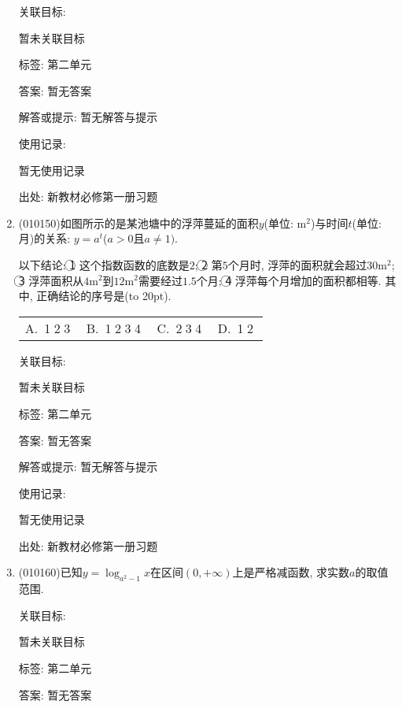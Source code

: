 \documentclass[10pt,a4paper]{article}
\newcommand{\bracket}[1]{(\hbox to #1pt{})}
\newcommand{\fourch}[4]{\par\begin{tabular}{p{.23\textwidth}p{.23\textwidth}p{.23\textwidth}p{.23\textwidth}}
A.~#1 &B.~#2& C.~#3& D.~#4
\end{tabular}}
\begin{document}
\begin{enumerate}[1.]
关联目标:

暂未关联目标



标签: 第二单元

答案: 暂无答案

解答或提示: 暂无解答与提示

使用记录:

暂无使用记录


出处: 新教材必修第一册习题
\item { (010150)}如图所示的是某池塘中的浮萍蔓延的面积$y$(单位: $\text{m}^2$)与时间$t$(单位: 月)的关系: $y=a^t$($a>0$且$a\ne 1)$. 
\begin{center}
\end{center}
以下结论:
\textcircled{1} 这个指数函数的底数是$2$; 
\textcircled{2} 第$5$个月时, 浮萍的面积就会超过$30\text{m}^2$;
\textcircled{3} 浮萍面积从$4\text{m}^2$到$12\text{m}^2$需要经过$1.5$个月;
\textcircled{4} 浮萍每个月增加的面积都相等. 其中, 正确结论的序号是\bracket{20}.
\fourch{\textcircled{1}\textcircled{2}\textcircled{3}}{\textcircled{1}\textcircled{2}\textcircled{3}\textcircled{4}}{\textcircled{2}\textcircled{3}\textcircled{4}}{\textcircled{1}\textcircled{2}}


关联目标:

暂未关联目标



标签: 第二单元

答案: 暂无答案

解答或提示: 暂无解答与提示

使用记录:

暂无使用记录


出处: 新教材必修第一册习题
\item { (010160)}已知$y=\log_{a^2-1}x$在区间$(0, +\infty)$上是严格减函数, 求实数$a$的取值范围.


关联目标:

暂未关联目标



标签: 第二单元

答案: 暂无答案


\end{enumerate}
\end{document}
